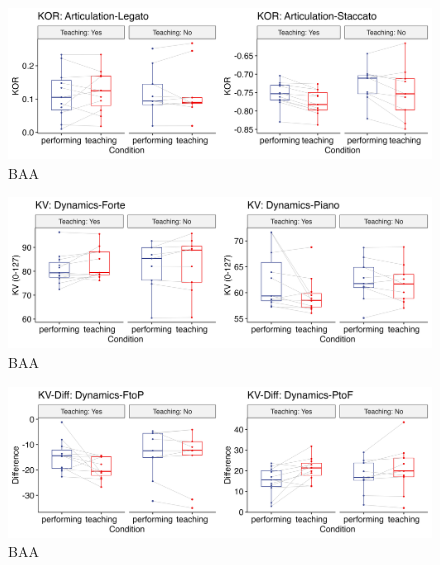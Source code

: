 \documentclass[
  man,floatsintext]{apa6}
\begin{document}
\begin{figure}
\includegraphics[width=1\linewidth]{manuscript_files/figure-latex/plot-art-teaching-2-1} \caption{\label{fig:art-teaching-2}BAA}\label{fig:plot-art-teaching-2}
\end{figure}

\begin{figure}
\includegraphics[width=1\linewidth]{manuscript_files/figure-latex/plot-dyn-teaching-2-1} \caption{\label{fig:dyn-teaching-2}BAA}\label{fig:plot-dyn-teaching-2}
\end{figure}

\begin{figure}
\includegraphics[width=1\linewidth]{manuscript_files/figure-latex/plot-dyn-diff-teaching-2-1} \caption{\label{fig:dyn-diff-teaching-2}BAA}\label{fig:plot-dyn-diff-teaching-2}
\end{figure}
\end{document}
